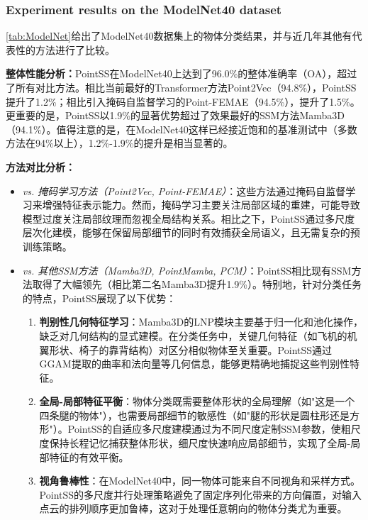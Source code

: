 \documentclass[preprint,12pt]{elsarticle}
\begin{document}
\subsubsection{Experiment results on the ModelNet40 dataset}

\cref{tab:ModelNet}给出了ModelNet40数据集上的物体分类结果，并与近几年其他有代表性的方法进行了比较。

\textbf{整体性能分析：}PointSS在ModelNet40上达到了96.0\%的整体准确率（OA），超过了所有对比方法。相比当前最好的Transformer方法Point2Vec（94.8\%），PointSS提升了1.2\%；相比引入掩码自监督学习的Point-FEMAE（94.5\%），提升了1.5\%。更重要的是，PointSS以1.9\%的显著优势超过了效果最好的SSM方法Mamba3D（94.1\%）。值得注意的是，在ModelNet40这样已经接近饱和的基准测试中（多数方法在94\%以上），1.2\%-1.9\%的提升是相当显著的。

\textbf{方法对比分析：}

\begin{itemize}
	\item \textit{vs. 掩码学习方法（Point2Vec, Point-FEMAE）}：这些方法通过掩码自监督学习来增强特征表示能力。然而，掩码学习主要关注局部区域的重建，可能导致模型过度关注局部纹理而忽视全局结构关系。相比之下，PointSS通过多尺度层次化建模，能够在保留局部细节的同时有效捕获全局语义，且无需复杂的预训练策略。
	
	\item \textit{vs. 其他SSM方法（Mamba3D, PointMamba, PCM）}：PointSS相比现有SSM方法取得了大幅领先（相比第二名Mamba3D提升1.9\%）。特别地，针对分类任务的特点，PointSS展现了以下优势：
	\begin{enumerate}
		\item \textbf{判别性几何特征学习}：Mamba3D的LNP模块主要基于归一化和池化操作，缺乏对几何结构的显式建模。在分类任务中，关键几何特征（如飞机的机翼形状、椅子的靠背结构）对区分相似物体至关重要。PointSS通过GGAM提取的曲率和法向量等几何信息，能够更精确地捕捉这些判别性特征。
		
		\item \textbf{全局-局部特征平衡}：物体分类既需要整体形状的全局理解（如"这是一个四条腿的物体"），也需要局部细节的敏感性（如"腿的形状是圆柱形还是方形"）。PointSS的自适应多尺度建模通过为不同尺度定制SSM参数，使粗尺度保持长程记忆捕获整体形状，细尺度快速响应局部细节，实现了全局-局部特征的有效平衡。
		
		\item \textbf{视角鲁棒性}：在ModelNet40中，同一物体可能来自不同视角和采样方式。PointSS的多尺度并行处理策略避免了固定序列化带来的方向偏置，对输入点云的排列顺序更加鲁棒，这对于处理任意朝向的物体分类尤为重要。
	\end{enumerate}
\end{itemize}
\end{document}
